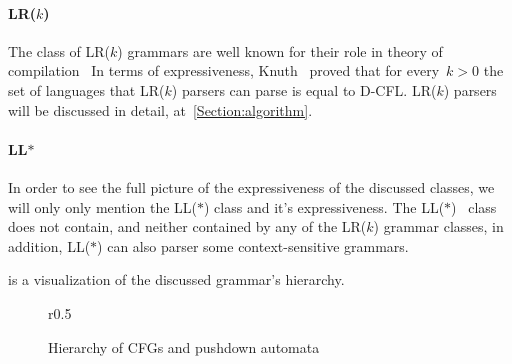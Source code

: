 \paragraph{LR($k$)}
The class of LR($k$) grammars are well known for their role in theory of compilation~\cite{Aho:86}
In terms of expressiveness, Knuth~\cite{Knuth:65} proved that for every~$k>0$ the set of languages
  that LR($k$) parsers can parse is equal to D-CFL.
LR($k$) parsers will be discussed in detail, at~\cref{Section:algorithm}.
\paragraph{LL{$*$}}
In order to see the full picture of the expressiveness of the discussed classes, we will only 
  only mention the LL($*$) class and it's expressiveness. The LL($*$)~\cite{Parr:2011} class does not contain,
  and neither contained by any of the LR($k$) grammar classes, in addition, LL($*$) can also 
  parser some context-sensitive grammars.
  
 is a visualization of the discussed grammar's hierarchy.

\begin{wrapfigure}r{0.5\linewidth}
  \caption{ \label{Figure:expressiveness}
  Hierarchy of CFGs and pushdown automata}
  
\end{wrapfigure}
